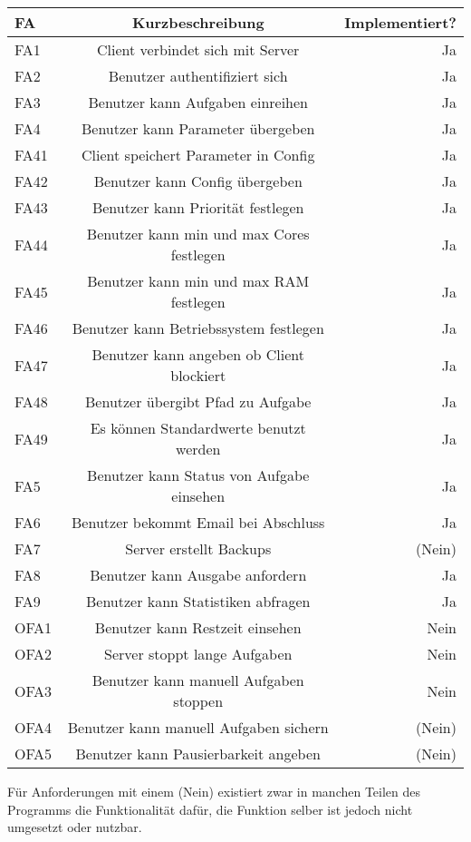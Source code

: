 \documentclass[a4paper,12pt]{article}
\begin{document}
\begin{tabular}{|l|c|r|}
	\hline
	FA & Kurzbeschreibung & Implementiert? \\ \hline \hline
	FA1 & Client verbindet sich mit Server & Ja \\ \hline
	FA2 & Benutzer authentifiziert sich & Ja \\ \hline
	FA3 & Benutzer kann Aufgaben einreihen & Ja \\ \hline
	FA4 & Benutzer kann Parameter übergeben & Ja \\ \hline
	FA41 & Client speichert Parameter in Config & Ja \\ \hline
	FA42 & Benutzer kann Config übergeben & Ja \\ \hline
	FA43 & Benutzer kann Priorität festlegen & Ja \\ \hline
	FA44 & Benutzer kann min und max Cores festlegen & Ja \\ \hline
	FA45 & Benutzer kann min und max RAM festlegen & Ja \\ \hline
	FA46 & Benutzer kann Betriebssystem festlegen & Ja \\ \hline
	FA47 & Benutzer kann angeben ob Client blockiert & Ja \\ \hline
	FA48 & Benutzer übergibt Pfad zu Aufgabe & Ja \\ \hline
	FA49 & Es können Standardwerte benutzt werden & Ja \\ \hline
	FA5 & Benutzer kann Status von Aufgabe einsehen & Ja \\ \hline
	FA6 & Benutzer bekommt Email bei Abschluss & Ja \\ \hline
	FA7 & Server erstellt Backups & (Nein) \\ \hline
	FA8 & Benutzer kann Ausgabe anfordern & Ja \\ \hline
	FA9 & Benutzer kann Statistiken abfragen & Ja \\ \hline \hline
	OFA1 & Benutzer kann Restzeit einsehen & Nein \\ \hline
	OFA2 & Server stoppt lange Aufgaben & Nein \\ \hline
	OFA3 & Benutzer kann manuell Aufgaben stoppen & Nein \\ \hline
	OFA4 & Benutzer kann manuell Aufgaben sichern & (Nein) \\ \hline
	OFA5 & Benutzer kann Pausierbarkeit angeben & (Nein) \\ \hline
\end{tabular}
\newline \newline
Für Anforderungen mit einem (Nein) existiert zwar in manchen Teilen des Programms die Funktionalität dafür, die Funktion selber ist jedoch nicht umgesetzt oder nutzbar.
\end{document}
